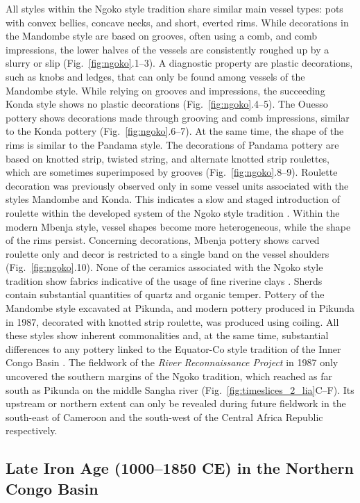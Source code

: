 \documentclass[smallextended,natbib]{svjour3}       %
\begin{document}
All styles within the Ngoko style tradition share similar main vessel types: pots with convex bellies, concave necks, and short, everted rims. While decorations in the Mandombe style are based on grooves, often using a comb, and comb impressions, the lower halves of the vessels are consistently roughed up by a slurry or slip (Fig.~\ref{fig:ngoko}.1--3). A diagnostic property are plastic decorations, such as knobs and ledges, that can only be found among vessels of the Mandombe style. While relying on grooves and impressions, the succeeding Konda style shows no plastic decorations (Fig.~\ref{fig:ngoko}.4--5). The Ouesso pottery shows decorations made through grooving and comb impressions, similar to the Konda pottery (Fig.~\ref{fig:ngoko}.6--7). At the same time, the shape of the rims is similar to the Pandama style. The decorations of Pandama pottery are based on knotted strip, twisted string, and alternate knotted strip roulettes, which are sometimes superimposed by grooves (Fig.~\ref{fig:ngoko}.8--9). Roulette decoration was previously observed only in some vessel units associated with the styles Mandombe and Konda. This indicates a slow and staged introduction of roulette within the developed system of the Ngoko style tradition \citep[120--123]{Seidensticker.2016b}. Within the modern Mbenja style, vessel shapes become more heterogeneous, while the shape of the rims persist. Concerning decorations, Mbenja pottery shows carved roulette only and decor is restricted to a single band on the vessel shoulders (Fig.~\ref{fig:ngoko}.10). None of the ceramics associated with the Ngoko style tradition show fabrics indicative of the usage of fine riverine clays \citep{Seidensticker.2020}. Sherds contain substantial quantities of quartz and organic temper. Pottery of the Mandombe style excavated at Pikunda, and modern pottery produced in Pikunda in 1987, decorated with knotted strip roulette, was produced using coiling. All these styles show inherent commonalities and, at the same time, substantial differences to any pottery linked to the Equator-Co style tradition of the Inner Congo Basin \citep{Wotzka.1995}. The fieldwork of the \textit{River Reconnaissance Project} in 1987 only uncovered the southern margins of the Ngoko tradition, which reached as far south as Pikunda on the middle Sangha river (Fig.~\ref{fig:timeslices_2_lia}C--F). Its upstream or northern extent can only be revealed during future fieldwork in the south-east of Cameroon and the south-west of the Central Africa Republic respectively.

\subsection*{Late Iron Age (1000--1850 CE) in the Northern Congo Basin}
\end{document}
